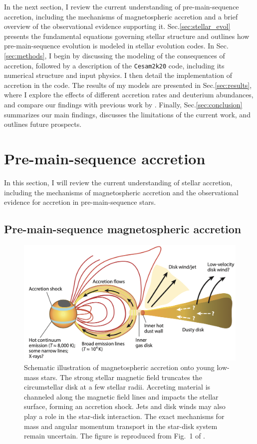 \documentclass[12pt,a4paper]{article}
\begin{document}
In the next section, I review the current understanding of pre-main-sequence accretion, including the mechanisms of magnetospheric accretion and a brief overview of the observational evidence supporting it. Sec.\ref{sec:stellar_evol} presents the fundamental equations governing stellar structure and outlines how pre-main-sequence evolution is modeled in stellar evolution codes. In Sec.\ref{sec:methods}, I begin by discussing the modeling of the consequences of accretion, followed by a description of the \texttt{Cesam2k20} code, including its numerical structure and input physics. I then detail the implementation of accretion in the code. The results of my models are presented in Sec.\ref{sec:results}, where I explore the effects of different accretion rates and deuterium abundances, and compare our findings with previous work by \textcite{PallaStahler1993}. Finally, Sec.\ref{sec:conclusion} summarizes our main findings, discusses the limitations of the current work, and outlines future prospects.

\section{Pre-main-sequence accretion}
\label{sec:background}

In this section, I will review the current understanding of stellar accretion, including the mechanisms of magnetospheric accretion and the observational evidence for accretion in pre-main-sequence stars. 

\subsection{Pre-main-sequence magnetospheric accretion}
\label{sec:magnetospheric_accretion}

\begin{figure}
  \centering
  \includegraphics[width=.8\textwidth]{HartmannEtAl2016_magnetospheric_accretion.png}
  \caption{Schematic illustration of magnetospheric accretion onto young low-mass stars. The strong stellar magnetic field truncates the circumstellar disk at a few stellar radii. Accreting material is channeled along the magnetic field lines and impacts the stellar surface, forming an accretion shock. Jets and disk winds may also play a role in the star-disk interaction. The exact mechanisms for mass and angular momentum transport in the star-disk system remain uncertain. The figure is reproduced from Fig.~1 of \textcite{HartmannEtAl2016}.}
  \label{fig:magnetospheric_accretion}
\end{figure}
\end{document}
